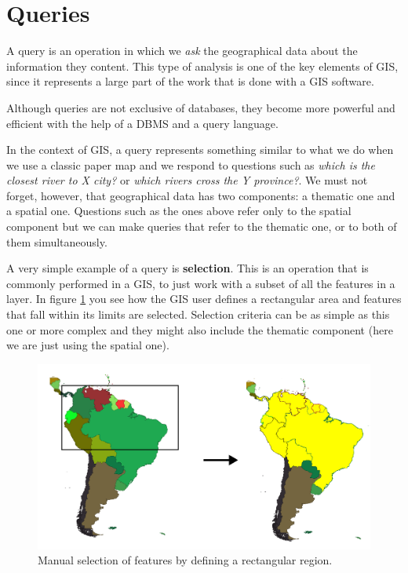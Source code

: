 \section{Queries}

A query is an operation in which we \emph{ask} the geographical data about the information they content. This type of analysis is one of the key elements of GIS, since it represents a large part of the work that is done with a GIS software.

Although queries are not exclusive of databases, they become more powerful and efficient with the help of a DBMS and a query language.

In the context of GIS, a query represents something similar to what we do when we use a classic paper map and we respond to questions such as \emph{which is the closest river to X city?} or \emph{which rivers cross the Y province?}. We must not forget, however, that geographical data has two components: a thematic one and a spatial one. Questions such as the ones above refer only to the spatial component but we can make queries that refer to the thematic one, or to both of them simultaneously.

A very simple example of a query is \textbf{selection}. This is an operation that is commonly performed in a GIS, to just work with a subset of all the features in a layer. In figure \ref{Fig:Selection} you see how the GIS user defines a rectangular area and features that fall within its limits are selected. Selection criteria can be as simple as this one or more complex and they might also include the thematic component (here we are just using the spatial one).

\begin{figure}[!hbt]   
\centering
\includegraphics[width=\textwidth]{databases/Selection.png}
\caption{\small Manual selection of features by defining a rectangular region.}
\label{Fig:Selection} 
\end{figure}


